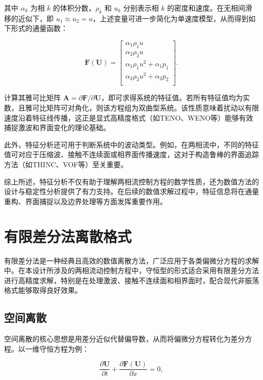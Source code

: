 \documentclass{article}
\numberwithin{equation}{section}    %
\begin{document}
其中 $\alpha_k$ 为相 $k$ 的体积分数，$\rho_k$ 和 $u_k$ 分别表示相 $k$ 的密度和速度。在无相间滑移的近似下，即 $u_1 \approx u_2 = u$，上述变量可进一步简化为单速度模型，从而得到如下形式的通量函数：

\begin{equation}
\mathbf{F}(\mathbf{U}) = \begin{bmatrix}
\alpha_1 \rho_1 u \\
\alpha_2 \rho_2 u \\
\alpha_1 \rho_1 u^2 + \alpha_1 p_1 \\
\alpha_2 \rho_2 u^2 + \alpha_2 p_2 \\
\end{bmatrix}.
\end{equation}

计算其雅可比矩阵 $\mathbf{A} = \partial \mathbf{F} / \partial \mathbf{U}$，即可求得系统的特征值。若所有特征值均为实数，且雅可比矩阵可对角化，则该方程组为双曲型系统。该性质意味着扰动以有限速度沿着特征线传播，这正是显式高精度格式（如TENO、WENO等）能够有效捕捉激波和界面变化的理论基础。

此外，特征分析还可用于判断系统中的波动类型。例如，在两相流中，不同的特征值可对应于压缩波、接触不连续面或相界面传播速度，这对于构造鲁棒的界面追踪方法（如THINC、VOF等）至关重要。

综上所述，特征分析不仅有助于理解两相流控制方程的数学性质，还为数值方法的设计与稳定性分析提供了有力支持。在后续的数值求解过程中，特征信息将在通量重构、界面捕捉以及边界处理等方面发挥重要作用。

\section{有限差分法离散格式}
有限差分法是一种经典且高效的数值离散方法，广泛应用于各类偏微分方程的求解中。在本设计所涉及的两相流动控制方程中，守恒型的形式适合采用有限差分方法进行高精度求解，特别是在处理激波、接触不连续面和相界面时，配合现代非振荡格式能够取得良好效果。

\subsection{空间离散}

空间离散的核心思想是用差分近似代替偏导数，从而将偏微分方程转化为差分方程。以一维守恒方程为例：

\begin{equation}
\frac{\partial \mathbf{U}}{\partial t} + \frac{\partial \mathbf{F}(\mathbf{U})}{\partial x} = 0,
\end{equation}
\end{document}
